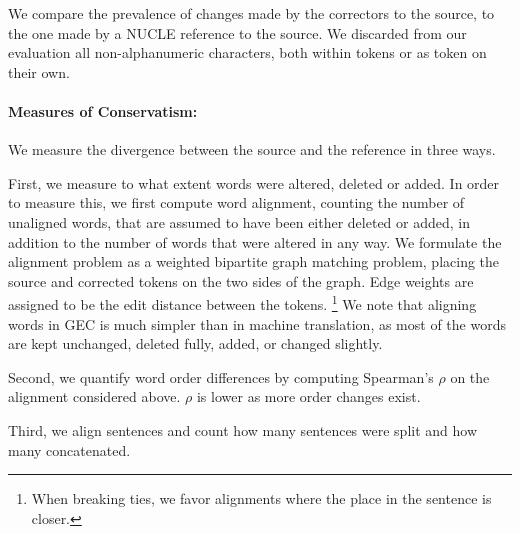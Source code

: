 \documentclass[letter,11pt]{article}
\newcommand{\oa}[1]{\footnote{\color{red}OA: #1}}
\begin{document}
We compare the prevalence of changes made by the correctors to the source,
to the one made by a NUCLE reference to the source.
We discarded from our evaluation all non-alphanumeric
characters, both within tokens or as token on their own.



\paragraph{Measures of Conservatism:}
We measure the divergence between the source and the reference in three ways.

First, we measure to what extent words were altered, deleted or added.
In order to measure this, we first compute word alignment,
counting the number of unaligned words, that are assumed to have been either
deleted or added, in addition to the number of words that
were altered in any way.
We formulate the alignment problem as a weighted bipartite graph matching problem,
placing the source and corrected tokens on the two sides of the graph.
Edge weights are assigned to be the edit distance between the tokens.
\footnote{When breaking ties, we favor alignments where the place in the sentence is closer.}
We note that aligning words in GEC is much simpler than in machine translation,
as most of the words are kept unchanged, deleted fully, added, or changed slightly.

Second, we quantify word order differences 
by computing Spearman's $\rho$ on the alignment considered above.
$\rho$ is lower as more order changes exist.

Third, we align
sentences and count how many sentences were split
and how many concatenated.
\end{document}
